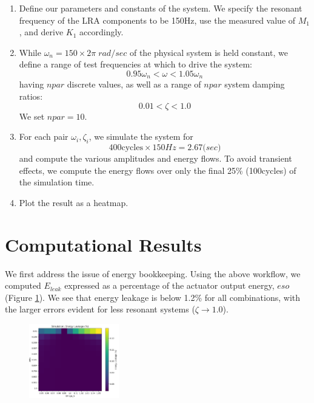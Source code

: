 \documentclass[letterpaper,11pt]{article}
\begin{document}
\begin{enumerate}
    \item Define our parameters and constants of the system. We specify the resonant
    frequency of the LRA components to be 150Hz, use the measured value of
    $M_1$, and derive $K_1$ accordingly.

    \item While $\omega_n = 150\times2\pi\;rad/sec$ of the physical system
    is held constant, we define a range of test
    frequencies at which to drive the system:
        \[
            0.95 \omega_n < \omega < 1.05 \omega_n
            \]
        having $npar$ discrete values, as well as a range of $npar$ system damping ratios:
            \[
                0.01 < \zeta < 1.0
                \]
    We set $npar=10$.

    \item For each pair $\omega_i, \zeta_i$, we simulate the system for
    \[
    400 \mathrm{cycles}\times 150 Hz = 2.67 \mathrm(sec)
    \]
    and compute the various  amplitudes and energy flows.
    To avoid transient effects, we compute the energy flows over only the final
    25\% (100cycles)
    of the simulation time.

    \item Plot the result as a heatmap.

\end{enumerate}



\section{Computational Results}

We first address the issue of energy bookkeeping.  Using the above workflow, we
 computed $E_{leak}$ expressed as a percentage of the actuator output energy,
$eso$ (Figure \ref{EleakFig}).   We see that energy leakage is below 1.2\%
for all combinations, with the larger errors evident for less resonant
systems ($\zeta \to 1.0$).


\begin{figure}
\includegraphics[width=0.35\textwidth]{heatmapleakage_11x11.png}
\caption{}\label{EleakFig}
\end{figure}
\end{document}
